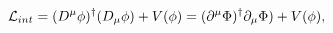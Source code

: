\begin{equation}
{\cal L}_{int}= (D^\mu\phi)^\dagger(D_\mu\phi) + V(\phi)
=(\partial^\mu\Phi)^\dagger\partial_\mu\Phi) + V(\phi),
\label{3.3d}
\end{equation}

